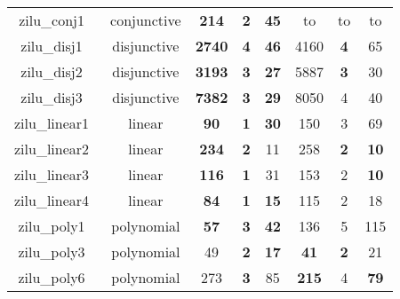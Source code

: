 \begin{table}[t]
\begin{tabular}{l c | c c c | c c c |}
\multicolumn{1}{|c|}{zilu\_conj1~\cite{zilu:repo}}				&conjunctive				&\textbf{214}	&\textbf{2}	&\textbf{45}	               &to	&to	&to									\\
\multicolumn{1}{|c|}{zilu\_disj1~\cite{zilu:repo}}				&disjunctive	& \textbf{2740} & \textbf{4} &\textbf{46}        &4160 	& \textbf{4} &{65} 				\\
\multicolumn{1}{|c|}{zilu\_disj2~\cite{zilu:repo}}				&disjunctive	& \textbf{3193} & \textbf{3} & \textbf{27}	     &5887 & \textbf{3} & 30  				\\
\multicolumn{1}{|c|}{zilu\_disj3~\cite{zilu:repo}}				&disjunctive	& \textbf{7382} & \textbf{3} &\textbf{29}	     &8050 & 4  & 40 		  				\\
\multicolumn{1}{|c|}{zilu\_linear1~\cite{zilu:repo}}			&linear			&\textbf{90}	&\textbf{1}	&\textbf{30}	&150	&3	&69\\
\multicolumn{1}{|c|}{zilu\_linear2~\cite{zilu:repo}}			&linear			&\textbf{234}	&\textbf{2}	&11	&258	&\textbf{2}	&\textbf{10}\\
\multicolumn{1}{|c|}{zilu\_linear3~\cite{zilu:repo}}			&linear			&\textbf{116}	&\textbf{1}	&31	&153	&2	&\textbf{10}\\
\multicolumn{1}{|c|}{zilu\_linear4~\cite{zilu:repo}}			&linear 		&\textbf{84}	&\textbf{1}	&\textbf{15}       &115	&2	&18								\\
\multicolumn{1}{|c|}{zilu\_poly1~\cite{zilu:repo}}				&polynomial		&\textbf{57}	&\textbf{3}	&\textbf{42}	               &136	&5	&115				\\
\multicolumn{1}{|c|}{zilu\_poly3~\cite{zilu:repo}}				&polynomial		&49	&\textbf{2}	&\textbf{17}				               &\textbf{41} &\textbf{2}	&21	\\
\multicolumn{1}{|c|}{zilu\_poly6~\cite{zilu:repo}}				&polynomial		&273	&\textbf{3}	&85	&\textbf{215}	&4	&\textbf{79}\\
\hline
\end{tabular}
\label{tbl:stats}
\end{table}


